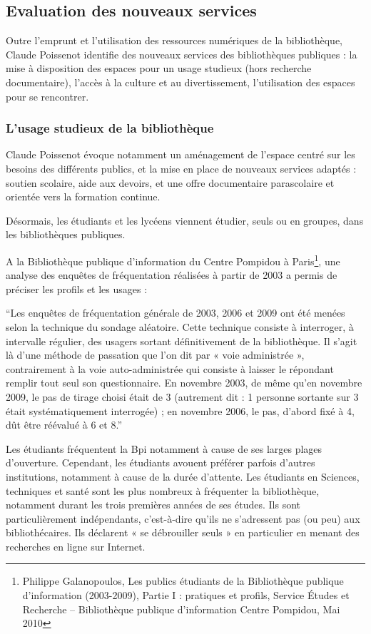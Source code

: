 \documentclass[french,a4paper,12pt]{article}
\begin{document}
\subsection{Evaluation des nouveaux services}

\quad Outre l’emprunt et l’utilisation des ressources numériques de la bibliothèque, Claude Poissenot identifie des nouveaux services des bibliothèques publiques : la mise à disposition des espaces pour un usage studieux (hors recherche documentaire), l’accès à la culture et au divertissement, l’utilisation des espaces pour se rencontrer. 

\subsubsection{L’usage studieux de la bibliothèque}

\quad Claude Poissenot évoque notamment un aménagement de l’espace centré sur les besoins des différents publics, et la mise en place de nouveaux services adaptés :  soutien scolaire, aide aux devoirs, et une offre documentaire parascolaire et orientée vers la formation continue. 

Désormais, les étudiants et les lycéens viennent étudier, seuls ou en groupes, dans les bibliothèques publiques.  

\quad A la Bibliothèque publique d’information du Centre Pompidou à Paris\footnote{Philippe Galanopoulos, Les publics étudiants de la Bibliothèque publique d’information (2003-2009), Partie I : pratiques et profils, Service Études et Recherche – Bibliothèque publique d'information Centre Pompidou, Mai 2010}, une analyse des enquêtes de fréquentation réalisées à partir de 2003 a permis de préciser les profils et les usages : 

“Les enquêtes de fréquentation générale de 2003, 2006 et 2009 ont été menées selon la technique du sondage aléatoire. Cette technique consiste à interroger, à intervalle régulier, des usagers sortant définitivement de la bibliothèque. Il s’agit là d’une méthode de passation que l’on dit par « voie administrée », contrairement à la voie auto-administrée qui consiste à laisser le répondant remplir tout seul son questionnaire. En novembre 2003, de même qu’en novembre 2009, le pas de tirage choisi était de 3 (autrement dit : 1 personne sortante sur 3 était systématiquement interrogée) ; en novembre 2006, le pas, d’abord fixé à 4, dût être réévalué à 6 et 8.” 

Les étudiants fréquentent la Bpi notamment à cause de ses larges plages d’ouverture. Cependant, les étudiants avouent préférer parfois d’autres institutions, notamment à cause de la durée d’attente. Les étudiants en Sciences, techniques et santé sont les plus nombreux à fréquenter la bibliothèque, notamment durant les trois premières années de ses études. Ils sont particulièrement indépendants, c’est-à-dire qu’ils ne s’adressent pas (ou peu) aux bibliothécaires. Ils déclarent « se débrouiller seuls » en particulier en menant des recherches en ligne sur Internet. 
\end{document}
